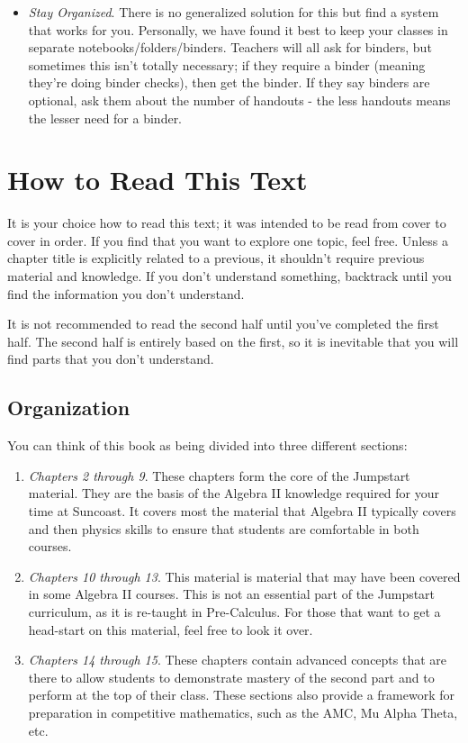 \documentclass[../book.tex]{subfiles}
\begin{document}
\begin{itemize}
    \item \textit{Stay Organized}.  There is no generalized solution for this but find a system that works for you.  Personally, we have found it best to keep your classes in separate notebooks/folders/binders.  Teachers will all ask for binders, but sometimes this isn't totally necessary; if they require a binder (meaning they're doing binder checks), then get the binder.  If they say binders are optional, ask them about the number of handouts - the less handouts means the lesser need for a binder.
\end{itemize} 


\section{How to Read This Text}
It is your choice how to read this text; it was intended to be read from cover to cover in order.  If you find that you want to explore one topic, feel free.  Unless a chapter title is explicitly related to a previous, it shouldn't require previous material and knowledge.  If you don't understand something, backtrack until you find the information you don't understand.

\begin{remark}
  It is not recommended to read the second half until you've completed the first half.  The second half is entirely based on the first, so it is inevitable that you will find parts that you don't understand.  
\end{remark}
\subsection{Organization}
\noindent You can think of this book as being divided into three different sections: \begin{enumerate}
    \item \textit{Chapters 2 through 9}.  These chapters form the core of the Jumpstart material.  They are the basis of the Algebra II knowledge required for your time at Suncoast.  It covers most the material that Algebra II typically covers and then physics skills to ensure that students are comfortable in both courses.
    \item \textit{Chapters 10 through 13}.  This material is material that may have been covered in some Algebra II courses.  This is not an essential part of the Jumpstart curriculum, as it is re-taught in Pre-Calculus.  For those that want to get a head-start on this material, feel free to look it over.
    \item \textit{Chapters 14 through 15}.  These chapters contain advanced concepts that are there to allow students to demonstrate mastery of the second part and to perform at the top of their class.  These sections also provide a framework for preparation in competitive mathematics, such as the AMC, Mu Alpha Theta, etc.
\end{enumerate}
\end{document}
